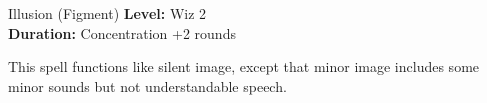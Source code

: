 {Illusion (Figment)}
{
	\textbf{Level:}
	Wiz 2\\
	\textbf{Duration:}
	Concentration +2 rounds\\
}
{
	This spell functions like silent image, except that minor image includes some minor sounds but not understandable speech.

}
